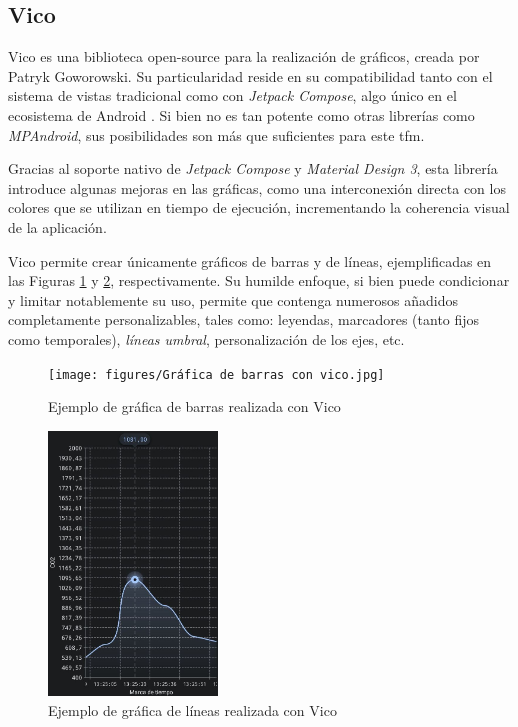     \subsection{Vico}
        
        Vico es una biblioteca \gls{open-source} para la realización de gráficos, creada por Patryk Goworowski. Su particularidad reside en su compatibilidad tanto con el sistema de vistas tradicional como con \textit{Jetpack Compose}, algo único en el ecosistema de Android \cite{goworowski_vico_nodate}. Si bien no es tan potente como otras librerías como \textit{MPAndroid}, sus posibilidades son más que suficientes para este \gls{tfm}. 
        
        Gracias al soporte nativo de \textit{Jetpack Compose} y \textit{Material Design 3}, esta librería introduce algunas mejoras en las gráficas, como una interconexión directa con los colores que se utilizan en tiempo de ejecución, incrementando la coherencia visual de la aplicación.

        Vico permite crear únicamente gráficos de barras y de líneas, ejemplificadas en las Figuras \ref{figure:vico:ejemplo_barras} y \ref{figure:vico:ejemplo_lineas}, respectivamente. Su humilde enfoque, si bien puede condicionar y limitar notablemente su uso, permite que contenga numerosos añadidos completamente personalizables, tales como: leyendas, marcadores (tanto fijos como temporales), \textit{líneas umbral}, personalización de los ejes, etc.

        \begin{figure}[h]
            \centering
            \texttt{[image: figures/Gráfica de barras con vico.jpg]}
            \caption{Ejemplo de gráfica de barras realizada con Vico}
            \label{figure:vico:ejemplo_barras}
        \end{figure}

        \begin{figure}[h]
            \centering
            \includegraphics[width=0.4\textwidth]{figures/Gráfica de líneas con vico.jpg}
            \caption{Ejemplo de gráfica de líneas realizada con Vico}
            \label{figure:vico:ejemplo_lineas}
        \end{figure}
        
